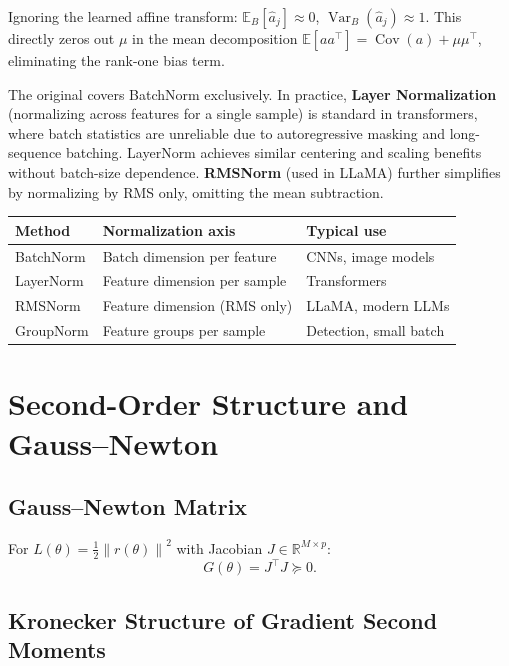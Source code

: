 \documentclass[12pt,a4paper]{article}
\theoremstyle{definition}
\theoremstyle{remark}
\newcommand{\E}{\mathbb{E}}
\newcommand{\Var}{\operatorname{Var}}
\newcommand{\Cov}{\operatorname{Cov}}
\newcommand{\R}{\mathbb{R}}
\newcommand{\norm}[1]{\left\lVert #1 \right\rVert}
\begin{document}
Ignoring the learned affine transform: $\E_B[\hat{a}_j] \approx 0$, $\Var_B(\hat{a}_j) \approx 1$. This directly zeros out $\mu$ in the mean decomposition $\E[aa^\top] = \Cov(a) + \mu\mu^\top$, eliminating the rank-one bias term.

\begin{critbox}
The original covers BatchNorm exclusively. In practice, \textbf{Layer Normalization} (normalizing across features for a single sample) is standard in transformers, where batch statistics are unreliable due to autoregressive masking and long-sequence batching. LayerNorm achieves similar centering and scaling benefits without batch-size dependence. \textbf{RMSNorm} (used in LLaMA) further simplifies by normalizing by RMS only, omitting the mean subtraction.
\end{critbox}

\begin{practbox}
\begin{tabular}{@{}lll@{}}
\toprule
\textbf{Method} & \textbf{Normalization axis} & \textbf{Typical use} \\
\midrule
BatchNorm  & Batch dimension per feature  & CNNs, image models \\
LayerNorm  & Feature dimension per sample & Transformers \\
RMSNorm    & Feature dimension (RMS only) & LLaMA, modern LLMs \\
GroupNorm  & Feature groups per sample    & Detection, small batch \\
\bottomrule
\end{tabular}
\end{practbox}

\section{Second-Order Structure and Gauss--Newton}

\subsection{Gauss--Newton Matrix}

For $L(\theta) = \frac{1}{2}\norm{r(\theta)}^2$ with Jacobian $J \in \R^{M \times p}$:
\[
G(\theta) = J^\top J \succeq 0.
\]

\subsection{Kronecker Structure of Gradient Second Moments}
\end{document}
